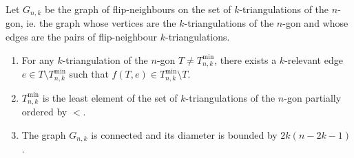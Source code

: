 \documentclass[12pt]{amsart}
\begin{document}
Let $G_{n,k}$ be the graph of flip-neighbours on the set of $k$-triangulations of the $n$-gon, ie. the graph whose vertices are the $k$-triangulations of the $n$-gon and whose edges are the pairs of flip-neighbour $k$-triangulations.

\begin{proposition}\label{connexity}
\begin{enumerate}
\item For any $k$-triangulation of the $n$-gon $T\ne T_{n,k}^{\min}$, there exists a $k$-relevant edge $e\in T\setminus T_{n,k}^{\min}$ such that $f(T,e)\in T_{n,k}^{\min}\setminus T$.
\item $T_{n,k}^{\min}$ is the least element of the set of $k$-triangulations of the $n$-gon partially ordered by $<$.
\item The graph $G_{n,k}$ is connected and its diameter is bounded by $2k(n-2k-1)$.
\end{enumerate}
\end{proposition}
\end{document}
